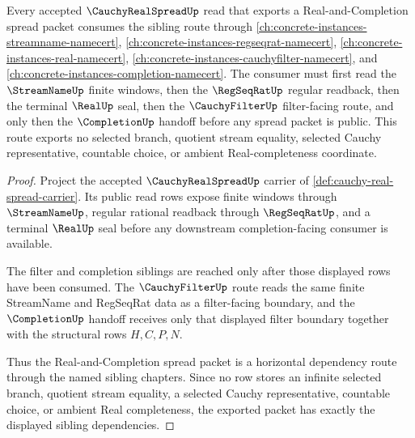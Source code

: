 \begin{theorem}
\label{thm:cauchy-real-spread-sibling-dependency}
Every accepted $\CauchyRealSpreadUp$ read that exports a Real-and-Completion spread packet consumes the sibling route through \autoref{ch:concrete-instances-streamname-namecert}, \autoref{ch:concrete-instances-regseqrat-namecert}, \autoref{ch:concrete-instances-real-namecert}, \autoref{ch:concrete-instances-cauchyfilter-namecert}, and \autoref{ch:concrete-instances-completion-namecert}. The consumer must first read the $\StreamNameUp$ finite windows, then the $\RegSeqRatUp$ regular readback, then the terminal $\RealUp$ seal, then the $\CauchyFilterUp$ filter-facing route, and only then the $\CompletionUp$ handoff before any spread packet is public. This route exports no selected branch, quotient stream equality, selected Cauchy representative, countable choice, or ambient Real-completeness coordinate.
\end{theorem}
\begin{proof}
Project the accepted $\CauchyRealSpreadUp$ carrier of \autoref{def:cauchy-real-spread-carrier}. Its public read rows expose finite windows through $\StreamNameUp$, regular rational readback through $\RegSeqRatUp$, and a terminal $\RealUp$ seal before any downstream completion-facing consumer is available.

The filter and completion siblings are reached only after those displayed rows have been consumed. The $\CauchyFilterUp$ route reads the same finite StreamName and RegSeqRat data as a filter-facing boundary, and the $\CompletionUp$ handoff receives only that displayed filter boundary together with the structural rows $H,C,P,N$.

Thus the Real-and-Completion spread packet is a horizontal dependency route through the named sibling chapters. Since no row stores an infinite selected branch, quotient stream equality, a selected Cauchy representative, countable choice, or ambient Real completeness, the exported packet has exactly the displayed sibling dependencies.
\end{proof}
